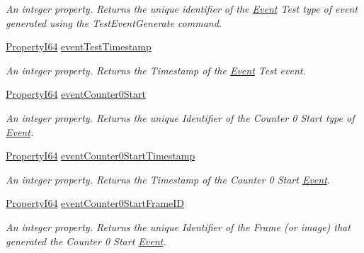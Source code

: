 \begin{DoxyCompactItemize}
\begin{DoxyCompactList}\small\item\em An integer property. Returns the unique identifier of the \hyperlink{classmv_i_m_p_a_c_t_1_1acquire_1_1_event}{Event} Test type of event generated using the Test\+Event\+Generate command. \end{DoxyCompactList}\item 
\hyperlink{group___common_interface_ga81749b2696755513663492664a18a893}{Property\+I64} \hyperlink{classmv_i_m_p_a_c_t_1_1acquire_1_1_gen_i_cam_1_1_event_control_af820e31dfbd429aac68f8fbe0dc2ff9f}{event\+Test\+Timestamp}
\begin{DoxyCompactList}\small\item\em An integer property. Returns the Timestamp of the \hyperlink{classmv_i_m_p_a_c_t_1_1acquire_1_1_event}{Event} Test event. \end{DoxyCompactList}\item 
\hyperlink{group___common_interface_ga81749b2696755513663492664a18a893}{Property\+I64} \hyperlink{classmv_i_m_p_a_c_t_1_1acquire_1_1_gen_i_cam_1_1_event_control_a529e74585b2328738c40ade2e007e2ce}{event\+Counter0\+Start}
\begin{DoxyCompactList}\small\item\em An integer property. Returns the unique Identifier of the Counter 0 Start type of \hyperlink{classmv_i_m_p_a_c_t_1_1acquire_1_1_event}{Event}. \end{DoxyCompactList}\item 
\hyperlink{group___common_interface_ga81749b2696755513663492664a18a893}{Property\+I64} \hyperlink{classmv_i_m_p_a_c_t_1_1acquire_1_1_gen_i_cam_1_1_event_control_a7aed8bb646dd9e3ea44e03d100cd467d}{event\+Counter0\+Start\+Timestamp}
\begin{DoxyCompactList}\small\item\em An integer property. Returns the Timestamp of the Counter 0 Start \hyperlink{classmv_i_m_p_a_c_t_1_1acquire_1_1_event}{Event}. \end{DoxyCompactList}\item 
\hyperlink{group___common_interface_ga81749b2696755513663492664a18a893}{Property\+I64} \hyperlink{classmv_i_m_p_a_c_t_1_1acquire_1_1_gen_i_cam_1_1_event_control_a2ecf85313a9c0ed8e21fa32a6d6bfb12}{event\+Counter0\+Start\+Frame\+I\+D}
\begin{DoxyCompactList}\small\item\em An integer property. Returns the unique Identifier of the Frame (or image) that generated the Counter 0 Start \hyperlink{classmv_i_m_p_a_c_t_1_1acquire_1_1_event}{Event}. \end{DoxyCompactList}\item 

\end{DoxyCompactItemize}
